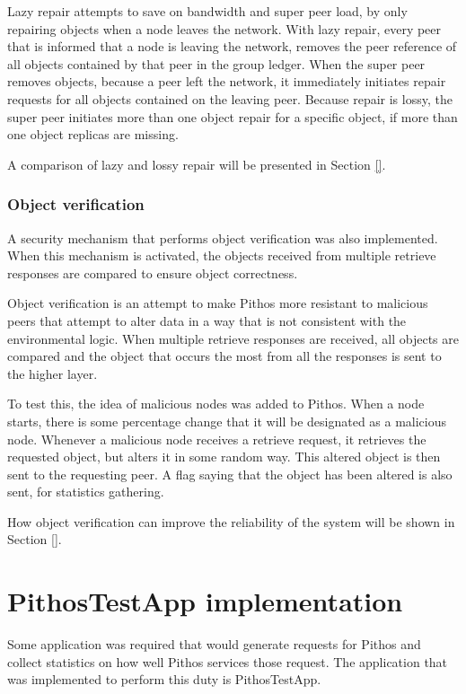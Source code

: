 Lazy repair attempts to save on bandwidth and super peer load, by only repairing objects when a node leaves the network. With lazy repair, every peer that is informed that a node is leaving the network, removes the peer reference of all objects contained by that peer in the group ledger. When the super peer removes objects, because a peer left the network, it immediately initiates repair requests for all objects contained on the leaving peer. Because repair is lossy, the super peer initiates more than one object repair for a specific object, if more than one object replicas are missing.

A comparison of lazy and lossy repair will be presented in Section \ref{}.

    \subsubsection{Object verification}
    \label{object_verification_implementation}

A security mechanism that performs object verification was also implemented. When this mechanism is activated, the objects received from multiple retrieve responses are compared to ensure object correctness.

Object verification is an attempt to make Pithos more resistant to malicious peers that attempt to alter data in a way that is not consistent with the environmental logic. When multiple retrieve responses are received, all objects are compared and the object that occurs the most from all the responses is sent to the higher layer.

To test this, the idea of malicious nodes was added to Pithos. When a node starts, there is some percentage change that it will be designated as a malicious node. Whenever a malicious node receives a retrieve request, it retrieves the requested object, but alters it in some random way. This altered object is then sent to the requesting peer. A flag saying that the object has been altered is also sent, for statistics gathering.

How object verification can improve the reliability of the system will be shown in Section \ref{}.

\section{PithosTestApp implementation}
\label{pithostestapp}

Some application was required that would generate requests for Pithos and collect statistics on how well Pithos services those request. The application that was implemented to perform this duty is PithosTestApp.

